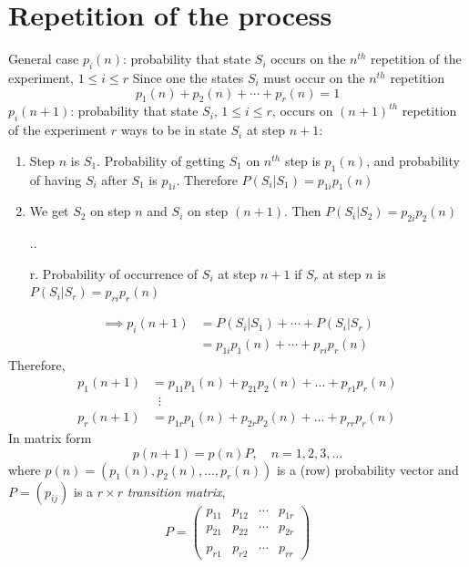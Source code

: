 \documentclass[aspectratio=43]{beamer}
\begin{document}
\section{Repetition of the process}
\begin{frame}{General case}
$p_i(n)$: probability that state $S_i$ occurs on the $n^{th}$ repetition of the experiment, $1\leq i\leq r$
\vfill
Since one the states $S_i$ must occur on the $n^{th}$ repetition
\[
p_1(n)+p_2(n)+\cdots+p_r(n)=1
\]
$p_i(n+1)$: probability that state $S_i$, $1\leq i\leq r$, occurs on $(n+1)^{th}$ repetition of the experiment
\vfill
$r$ ways to be in state $S_i$ at step $n+1$:
\begin{enumerate}
\item Step $n$ is $S_1$. Probability of getting $S_1$ on $n^{th}$ step is $p_1(n)$, and probability of having $S_i$ after $S_1$ is $p_{1i}$. Therefore $P(S_i|S_1)=p_{1i}p_1(n)$
\item We get $S_2$ on step $n$ and $S_i$ on step $(n+1)$. Then $P(S_i|S_2)=p_{2i}p_2(n)$
\item[..]
\item[r.] Probability of occurrence of $S_i$ at step $n+1$ if $S_r$ at step $n$ is $P(S_i|S_r)=p_{ri}p_r(n)$
\end{enumerate}
\end{frame}


\begin{frame}
\begin{align*}
\implies
p_i(n+1) &= P(S_i|S_1)+\cdots+P(S_i|S_r) \\
&= p_{1i}p_1(n)+\cdots+p_{ri}p_r(n)
\end{align*}
Therefore,
\begin{align*}
p_1(n+1) &= p_{11}p_1(n)+p_{21}p_2(n)+\dots+p_{r1}p_r(n) \\
& \;\;\vdots\\
p_r(n+1) &= p_{1r}p_1(n)+p_{2r}p_2(n)+\dots+p_{rr}p_r(n)
\end{align*}
\vfill
In matrix form
\[
p(n+1)=p(n)P, \quad n=1,2,3,\dots
\]
where $p(n)=(p_1(n),p_{2}(n),\dots , p_r(n))$ is a (row) probability vector and $P=(p_{ij})$ is a $r\times r$ \emph{transition matrix},
\[
P=
\begin{pmatrix}
p_{11} & p_{12} & \cdots & p_{1r} \\
p_{21} & p_{22} & \cdots & p_{2r} \\
&&& \\
p_{r1} & p_{r2} & \cdots & p_{rr}
\end{pmatrix}
\]
\end{frame}
\end{document}
